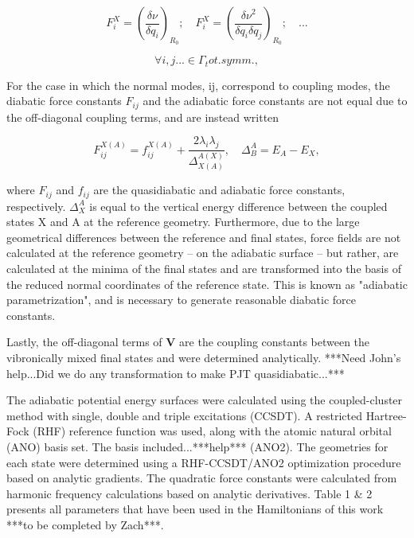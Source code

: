 \documentclass{article}
\begin{document}
\begin{equation*}
F^X_i = \left(\frac{\delta\nu}{\delta q_i}\right)_{R_0} ; \quad F^X_i = \left(\frac{\delta\nu^2}{\delta q_i\delta q_j}\right)_{R_0} ;\quad ...
\end{equation*}

\begin{equation*}
\forall i,j...\in\Gamma{_tot.symm.},
\end{equation*}

For the case in which the normal modes, ij, correspond to coupling modes, the diabatic force constants $F_{ij}$ and the adiabatic force constants are not equal due to the off-diagonal coupling terms, and are instead written

\begin{equation*}
F^{X(A)}_{ij} = f_{ij}^{X(A)} + \frac{2\lambda_{i}\lambda_{j}}{\Delta^{A(X)}_{X(A)}}, \quad \Delta^{A}_{B} = E_A - E_X,
\end{equation*}

where $F_{ij}$ and $f_{ij}$ are the quasidiabatic and adiabatic force constants, respectively. $\Delta^{A}_{X}$ is equal to the vertical energy difference between the coupled states X and A at the reference geometry. 
Furthermore, due to the large geometrical differences between the reference and final states, force fields are not calculated at the reference geometry -- on the adiabatic surface -- but rather, are calculated at the minima of the final states and are transformed into the basis of the reduced normal coordinates of the reference state. This is known as "adiabatic parametrization", and is necessary to generate reasonable diabatic force constants.

Lastly, the off-diagonal terms of $\boldsymbol{V}$ are the coupling constants between the vibronically mixed final states and were determined analytically. ***Need John's help...Did we do any transformation to make PJT quasidiabatic...***

The adiabatic potential energy surfaces were calculated using the coupled-cluster method with single, double and triple excitations (CCSDT). A restricted Hartree-Fock (RHF) reference function was used, along with the atomic natural orbital (ANO) basis set. The basis included...***help*** (ANO2). The geometries for each state were determined using a RHF-CCSDT/ANO2 optimization procedure based on analytic gradients. The quadratic force constants were calculated from harmonic frequency calculations based on analytic derivatives. Table 1 \& 2 presents all parameters that have been used in the Hamiltonians of this work ***to be completed by Zach***.
\end{document}
